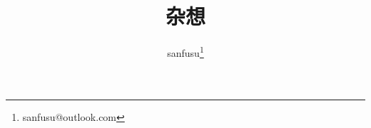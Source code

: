 \documentclass{ctexart}
\theoremstyle{definition} \newtheorem{exposition}{记}[section]
\begin{document}
\title{杂想}
\author{sanfusu\thanks{sanfusu@outlook.com}}
\maketitle
\end{document}
